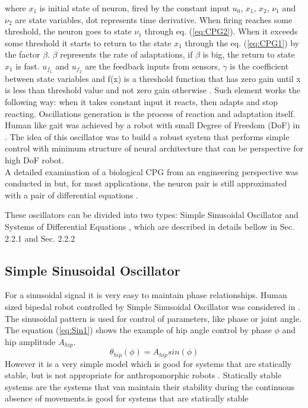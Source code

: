 \documentclass[12pt,a4paper]{report}
\begin{document}
		where $x_1$  is initial state of neuron, fired by the constant input $u_0$, $x_1$, $x_2$, $\nu_1$ and $\nu_2$ are state variables, dot represents time derivative.  When firing reaches some threshold, the neuron goes to state $\nu_1$ through eq. (\ref{eq:CPG2}). When it exceeds some threshold it starts to return to the state $x_1$ through the eq. (\ref{eq:CPG1}) by the factor $\beta$. $\beta$ represents the rate of adaptations, if $\beta$ is big, the return to state $x_1$ is fast. $u_{f_1}$ and $u_{f_2}$ are the feedback inputs from sensors, $\gamma$ is the coefficient between state variables and f(x) is a threshold function that has zero gain until x is less than threshold value and not zero gain otherwise . Such element works the following way: when it takes constant input it reacts, then adapts and stop reacting. Oscillations generation is the process of reaction and adaptation itself. \\
		
		Human like gait was achieved by a robot with small Degree of Freedom (DoF) in \cite{miyakoshi1998three}. The idea of this oscillator was to build a robust system that performs simple control with minimum structure of neural architecture that can be perspective for high DoF robot.\\
		
		A detailed examination of a biological CPG from an engineering perspective was conducted in \cite{zhu2006central} but, for most applications, the neuron pair is still approximated with a pair of differential equations \cite{wright2014intelligent}.

		These oscillators can be divided into two types: Simple Sinusoidal Oscillator and Systems of Differential Equations \cite{wright2014intelligent}, which are described in details bellow in Sec. 2.2.1 and Sec. 2.2.2

		\subsection{Simple Sinusoidal Oscillator}
			For a sinusoidal signal it is very easy to maintain phase relationships. Human sized bipedal robot controlled by Simple Sinusoidal Oscillator was considered in \cite{morimoto2008biologically}. The sinusoidal pattern is used for control of parameters, like phase or joint angle. The equation (\ref{eq:Sin1}) shows the example of hip angle control by phase $\phi$ and hip amplitude $A_{hip}$.
			\begin{equation}\label{eq:Sin1}
				\theta_{hip} (\phi) = A_{hip} sin(\phi) 
			\end{equation}
 			However it is a very simple model which is good for systems that are statically stable, but is not appropriate for anthropomorphic robots \cite{wright2014intelligent}. Statically stable systems are the systems that van maintain their stability during the continuous absence of movements.is good for systems that are statically stable
\end{document}
